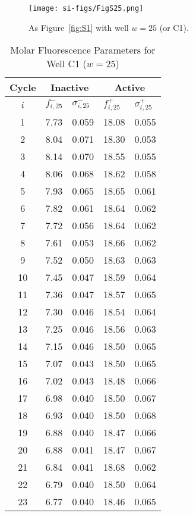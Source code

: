                 \begin{figure}
                    \centering
                    \texttt{[image: si-figs/FigS25.png]}
                    \caption{
                        As Figure~\ref{fig:S1} with well $w=25$ (or C1).
                    }
                \end{figure}
                \clearpage
    \begin{table}
        \caption{Molar Fluorescence Parameters for Well C1 ($w=25$)}
        \centering
        \begin{tabular}{c|ll|ll}
            Cycle & \multicolumn{2}{c|}{Inactive} & \multicolumn{2}{c}{Active} \\
            \hline
            $i$ & $f_{i,25}^{-}$ & $\sigma_{i,25}^{-}$ &  $f_{i,25}^{+}$ & $\sigma_{i,25}^{+}$ \\
            \hline
    1 & 7.73 & 0.059 & 18.08 & 0.055 \\
2 & 8.04 & 0.071 & 18.30 & 0.053 \\
3 & 8.14 & 0.070 & 18.55 & 0.055 \\
4 & 8.06 & 0.068 & 18.62 & 0.058 \\
5 & 7.93 & 0.065 & 18.65 & 0.061 \\
6 & 7.82 & 0.061 & 18.64 & 0.062 \\
7 & 7.72 & 0.056 & 18.64 & 0.062 \\
8 & 7.61 & 0.053 & 18.66 & 0.062 \\
9 & 7.52 & 0.050 & 18.63 & 0.063 \\
10 & 7.45 & 0.047 & 18.59 & 0.064 \\
11 & 7.36 & 0.047 & 18.57 & 0.065 \\
12 & 7.30 & 0.046 & 18.54 & 0.064 \\
13 & 7.25 & 0.046 & 18.56 & 0.063 \\
14 & 7.15 & 0.046 & 18.50 & 0.065 \\
15 & 7.07 & 0.043 & 18.50 & 0.065 \\
16 & 7.02 & 0.043 & 18.48 & 0.066 \\
17 & 6.98 & 0.040 & 18.50 & 0.067 \\
18 & 6.93 & 0.040 & 18.50 & 0.068 \\
19 & 6.88 & 0.040 & 18.47 & 0.066 \\
20 & 6.88 & 0.041 & 18.47 & 0.067 \\
21 & 6.84 & 0.041 & 18.68 & 0.062 \\
22 & 6.79 & 0.040 & 18.50 & 0.064 \\
23 & 6.77 & 0.040 & 18.46 & 0.065 \\

\end{tabular}
\end{table}
